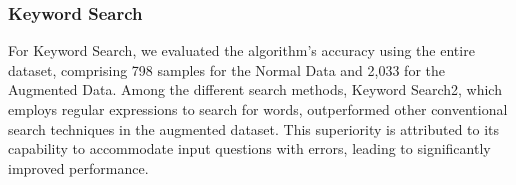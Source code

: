 \documentclass[12pt,oneside,openright,a4paper]{cpe-english-project}
\begin{document}
      \subsubsection{Keyword Search}
        \begin{table}
          \centering
          \caption{Operation Classification with Added Normal and Augmented Experiment Result (Keyword Search)}
        \end{table}
        \qquad For Keyword Search, we evaluated the algorithm’s accuracy using the entire dataset, comprising 798 samples for the Normal Data and 2,033 for the Augmented Data. Among the different search methods, Keyword Search2, which employs regular expressions to search for words, outperformed other conventional search techniques in the augmented dataset. This superiority is attributed to its capability to accommodate input questions with errors, leading to significantly improved performance. \par
\end{document}
